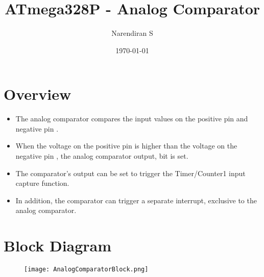 \documentclass{article}
\title{ATmega328P - Analog Comparator}
\author{Narendiran S}
\date{\today}
\begin{document}
\maketitle

\section{Overview}
\begin{itemize}
    \item The analog comparator compares the input values on the positive pin  and negative pin .
    \item When the voltage on the positive pin  is higher than the voltage on the negative pin , the analog comparator output,  bit is set.
    \item The comparator’s output can be set to trigger the Timer/Counter1 input capture function.
    \item In addition, the comparator can trigger a separate interrupt, exclusive to the analog comparator. 
\end{itemize}
\section{Block Diagram}
\begin{figure}[H]
    \centering
    \texttt{[image: AnalogComparatorBlock.png]}
\end{figure}
\end{document}
